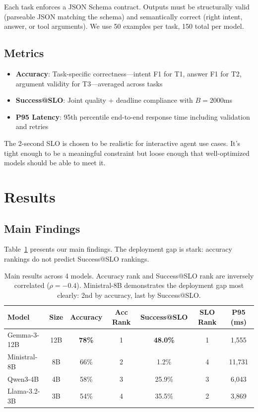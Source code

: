 \documentclass[11pt]{article}
\begin{document}
Each task enforces a JSON Schema contract.
Outputs must be structurally valid (parseable JSON matching the schema) and semantically correct (right intent, answer, or tool arguments).
We use 50 examples per task, 150 total per model.

\subsection{Metrics}

\begin{itemize}[leftmargin=12pt]
    \item \textbf{Accuracy}: Task-specific correctness---intent F1 for T1, answer F1 for T2, argument validity for T3---averaged across tasks
    \item \textbf{Success@SLO}: Joint quality + deadline compliance with $B = 2000$ms
    \item \textbf{P95 Latency}: 95th percentile end-to-end response time including validation and retries
\end{itemize}

The 2-second SLO is chosen to be realistic for interactive agent use cases.
It's tight enough to be a meaningful constraint but loose enough that well-optimized models should be able to meet it.

\section{Results}
\label{sec:results}

\subsection{Main Findings}

Table~\ref{tab:main-results} presents our main findings.
The deployment gap is stark: accuracy rankings do not predict Success@SLO rankings.

\begin{table}[t]
\centering
\caption{Main results across 4 models. Accuracy rank and Success@SLO rank are inversely correlated ($\rho = -0.4$). Ministral-8B demonstrates the deployment gap most clearly: 2nd by accuracy, last by Success@SLO.}
\label{tab:main-results}
\begin{tabular}{lcccccc}
\toprule
\textbf{Model} & \textbf{Size} & \textbf{Accuracy} & \textbf{Acc Rank} & \textbf{Success@SLO} & \textbf{SLO Rank} & \textbf{P95 (ms)} \\
\midrule
Gemma-3-12B & 12B & \textbf{78\%} & 1 & \textbf{48.0\%} & 1 & 1,555 \\
Ministral-8B & 8B & 66\% & 2 & 1.2\% & 4 & 11,731 \\
Qwen3-4B & 4B & 58\% & 3 & 25.9\% & 3 & 6,043 \\
Llama-3.2-3B & 3B & 54\% & 4 & 35.5\% & 2 & 3,869 \\
\bottomrule
\end{tabular}
\end{table}
\end{document}

